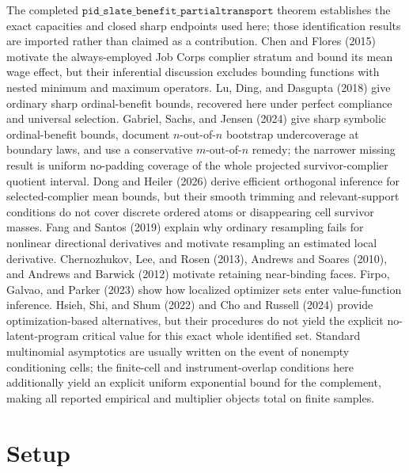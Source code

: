 \documentclass{article}
\begin{document}
The completed \(\texttt{pid\_slate\_benefit\_partialtransport}\) theorem establishes the exact capacities and closed sharp endpoints used here; those identification results are imported rather than claimed as a contribution. Chen and Flores (2015) motivate the always-employed Job Corps complier stratum and bound its mean wage effect, but their inferential discussion excludes bounding functions with nested minimum and maximum operators. Lu, Ding, and Dasgupta (2018) give ordinary sharp ordinal-benefit bounds, recovered here under perfect compliance and universal selection. Gabriel, Sachs, and Jensen (2024) give sharp symbolic ordinal-benefit bounds, document \(n\)-out-of-\(n\) bootstrap undercoverage at boundary laws, and use a conservative \(m\)-out-of-\(n\) remedy; the narrower missing result is uniform no-padding coverage of the whole projected survivor-complier quotient interval. Dong and Heiler (2026) derive efficient orthogonal inference for selected-complier mean bounds, but their smooth trimming and relevant-support conditions do not cover discrete ordered atoms or disappearing cell survivor masses. Fang and Santos (2019) explain why ordinary resampling fails for nonlinear directional derivatives and motivate resampling an estimated local derivative. Chernozhukov, Lee, and Rosen (2013), Andrews and Soares (2010), and Andrews and Barwick (2012) motivate retaining near-binding faces. Firpo, Galvao, and Parker (2023) show how localized optimizer sets enter value-function inference. Hsieh, Shi, and Shum (2022) and Cho and Russell (2024) provide optimization-based alternatives, but their procedures do not yield the explicit no-latent-program critical value for this exact whole identified set. Standard multinomial asymptotics are usually written on the event of nonempty conditioning cells; the finite-cell and instrument-overlap conditions here additionally yield an explicit uniform exponential bound for the complement, making all reported empirical and multiplier objects total on finite samples.

\section{Setup}
\end{document}
